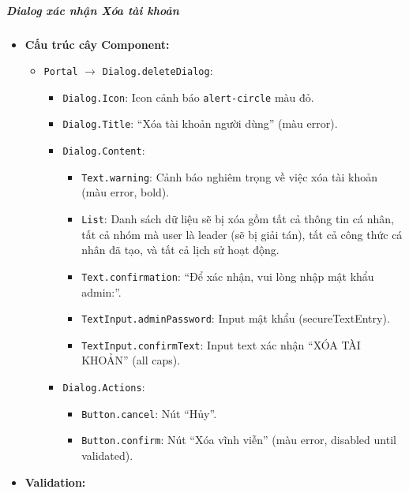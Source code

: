 \subparagraph{Dialog xác nhận Xóa tài khoản}
\begin{itemize}
    \item \textbf{Cấu trúc cây Component:}
        \begin{itemize}
            \item \texttt{Portal} $\rightarrow$ \texttt{Dialog.deleteDialog}:
                \begin{itemize}
                    \item \texttt{Dialog.Icon}: Icon cảnh báo \texttt{alert-circle} màu đỏ.
                    \item \texttt{Dialog.Title}: ``Xóa tài khoản người dùng'' (màu error).
                    \item \texttt{Dialog.Content}:
                        \begin{itemize}
                            \item \texttt{Text.warning}: Cảnh báo nghiêm trọng về việc xóa tài khoản (màu error, bold).
                            \item \texttt{List}: Danh sách dữ liệu sẽ bị xóa gồm tất cả thông tin cá nhân, tất cả nhóm mà user là leader (sẽ bị giải tán), tất cả công thức cá nhân đã tạo, và tất cả lịch sử hoạt động.
                            \item \texttt{Text.confirmation}: ``Để xác nhận, vui lòng nhập mật khẩu admin:''.
                            \item \texttt{TextInput.adminPassword}: Input mật khẩu (secureTextEntry).
                            \item \texttt{TextInput.confirmText}: Input text xác nhận ``XÓA TÀI KHOẢN'' (all caps).
                        \end{itemize}
                    \item \texttt{Dialog.Actions}:
                        \begin{itemize}
                            \item \texttt{Button.cancel}: Nút ``Hủy''.
                            \item \texttt{Button.confirm}: Nút ``Xóa vĩnh viễn'' (màu error, disabled until validated).
                        \end{itemize}
                \end{itemize}
        \end{itemize}
    \item \textbf{Validation:}
        \begin{itemize}

\end{itemize}
\end{itemize}

